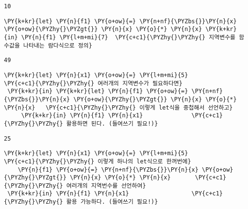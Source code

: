     
    \begin{Verbatim}[commandchars=\\\{\}]
10
    \end{Verbatim}

    
    \begin{tcolorbox}[breakable, size=fbox, boxrule=1pt, pad at break*=1mm,colback=cellbackground, colframe=cellborder, top=.75ex]
\begin{Verbatim}[commandchars=\\\{\}]
\PY{k+kr}{let} \PY{n}{f1} \PY{o+ow}{=} \PY{n+nf}{\PYZbs{}}\PY{n}{x} \PY{o+ow}{\PYZhy{}\PYZgt{}} \PY{n}{x} \PY{o}{*} \PY{n}{x} \PY{k+kr}{in} \PY{n}{f1} \PY{l+m+mi}{7}  \PY{c+c1}{\PYZhy{}\PYZhy{} 지역변수를 함수값을 나타내는 람다식으로 정의}
\end{Verbatim}
\end{tcolorbox}

    
    \begin{Verbatim}[commandchars=\\\{\}]
49
    \end{Verbatim}

    
    \begin{tcolorbox}[breakable, size=fbox, boxrule=1pt, pad at break*=1mm,colback=cellbackground, colframe=cellborder, top=.75ex]
\begin{Verbatim}[commandchars=\\\{\}]
\PY{k+kr}{let} \PY{n}{x1} \PY{o+ow}{=} \PY{l+m+mi}{5}                 \PY{c+c1}{\PYZhy{}\PYZhy{} 여러개의 지역변수가 필요하다면}
 \PY{k+kr}{in} \PY{k+kr}{let} \PY{n}{f1} \PY{o+ow}{=} \PY{n+nf}{\PYZbs{}}\PY{n}{x} \PY{o+ow}{\PYZhy{}\PYZgt{}} \PY{n}{x} \PY{o}{*} \PY{n}{x}   \PY{c+c1}{\PYZhy{}\PYZhy{} 이렇게 let식을 중첩해서 선언하고}
     \PY{k+kr}{in} \PY{n}{f1} \PY{n}{x1}              \PY{c+c1}{\PYZhy{}\PYZhy{} 활용하면 된다. (들여쓰기 필요!)}
\end{Verbatim}
\end{tcolorbox}

    
    \begin{Verbatim}[commandchars=\\\{\}]
25
    \end{Verbatim}

    
    \begin{tcolorbox}[breakable, size=fbox, boxrule=1pt, pad at break*=1mm,colback=cellbackground, colframe=cellborder, top=.75ex]
\begin{Verbatim}[commandchars=\\\{\}]
\PY{k+kr}{let} \PY{n}{x1} \PY{o+ow}{=} \PY{l+m+mi}{5}                 \PY{c+c1}{\PYZhy{}\PYZhy{} 이렇게 하나의 let식으로 한꺼번에}
    \PY{n}{f1} \PY{o+ow}{=} \PY{n+nf}{\PYZbs{}}\PY{n}{x} \PY{o+ow}{\PYZhy{}\PYZgt{}} \PY{n}{x} \PY{o}{*} \PY{n}{x}       \PY{c+c1}{\PYZhy{}\PYZhy{} 여러개의 지역번수를 선언하여}
 \PY{k+kr}{in} \PY{n}{f1} \PY{n}{x1}                  \PY{c+c1}{\PYZhy{}\PYZhy{} 활용 가능하다. (들여쓰기 필요!)}
\end{Verbatim}
\end{tcolorbox}

